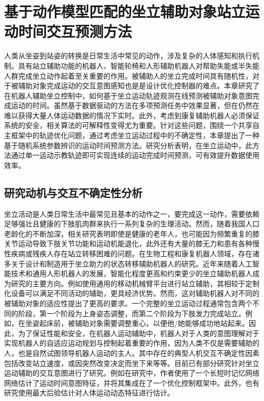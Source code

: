 \chapter{基于动作模型匹配的坐立辅助对象站立运动时间交互预测方法}
人类从坐姿到站姿的转换是日常生活中常见的动作，涉及复杂的人体感知和执行机制。具有站立辅助功能的机器人、智能轮椅和人形辅助机器人对帮助失能或半失能人群完成坐立动作起着至关重要的作用。被辅助人的坐立完成时间具有随机性，对于被辅助对象完成运动的交互意图感知也是是设计优化控制器的难点。本章研究了在机器人辅助坐立控制中，如何基于坐立运动轨迹观测在线预测被辅助对象意图完成运动的时间。虽然基于数据驱动的方法在多项预测任务中效果显著，但在仍然在难以获得大量人体运动数据的情况下实时。此外，考虑到康复辅助机器人必须保证系统的安全，相关算法的可解释性变得尤为重要。针对这些问题，围绕一个共享自主框架中的轨迹优化问题，通过考虑坐立运动过程中的不确定性，本章提出了一种基于随机系统参数辨识的运动时间预测方法。研究分析表明，在坐立运动中，此方法通过单一运动示教轨迹即可实现连续的运动完成时间预测，可有效提升数据使用效率。

\section{研究动机与交互不确定性分析}
坐立活动是人类日常生活中最常见且基本的动作之一，要完成这一动作，需要依赖足够强壮且健康的下肢肌肉群来执行一系列复杂的生理活动。然而，随着我国人口老龄化的不断加深，相关研究表明即使是健康的老年人，也可能因为频繁重复的膝关节运动导致下肢关节功能和运动机能退化\cite{heidariKneeOsteoarthritisPrevalence2011}，此外还有大量的膝无力和患有各种慢性疾病或残疾人存在站立转移困难的问题。在生物工程和康复机器人领域，存在诸多关于设计和制造用于坐立助力的状态转移辅助机器人的研究。近年来随着人工智能技术和通用人形机器人的发展，智能化程度更高和约束更少的坐立辅助机器人成为研究的主要方向。例如使用通用的移动机械臂平台进行站立辅助，其相较于定制化设备可以满足不同活动的辅助，更具经济优势\cite{liIntegratedApproachRobotic2021}。然而，这对辅助机器人对不同的被辅助对象的适应性提出了更高的要求。一个完整的坐立运动过程通常包含两个不同的阶段，第一个阶段为上身姿态调整，而第二个阶段为下肢发力完成站立。例如，在坐姿起床前，被辅助对象需要调整重心，以便他/她能够成功地站起来。因此，为了保证性能和安全，在机器人运动辅助中，机器人对于人类的意图理解对于实现机器人的自适应运动规划与控制起着重要的作用，因为人类不仅是需要辅助的人，也是自然试图领导机器人运动的主人。其中存在的典型人机交互不确定性因素包括改变站立速度，或因突然改变决定而坐下来等等。目前已有部分研究针对坐立运动辅助的交互意图进行了研究。例如在研究\cite{liIntegratedApproachRobotic2021}中，作者使用了一个长短时记忆网络网络估计了运动时间意图特征，并将其集成在了一个优化控制框架中。此外，也有研究使用最大后验估计对人体运动动态特征进行估计\cite{romanoCoDyCoProjectAchievements2018}。

